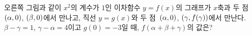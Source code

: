 \noindent\begin{minipage}[t]{0.58\linewidth}\vspace{0pt}\raggedright 오른쪽 그림과 같이 $x^2$의 계수가 $1$인 이차함수 $y=f(x)$의 그래프가 $x$축과 두 점~$(\alpha{,}\mkern3mu\mathopen{}0)$, $(\beta{,}\mkern3mu\mathopen{}0)$에서 만나고, 직선 $y=g(x)$와 두 점~$(\alpha{,}\mkern3mu\mathopen{}0)$, $(\gamma{,}\mkern3mu\mathopen{}f(\gamma))$에서 만난다. $\beta-\gamma=1$, $\gamma-\alpha=4$이고 $g(0)=-3$일 때, $f(\alpha+\beta+\gamma)$의 값은? \dmcondfill{$\alpha<\gamma<\beta$}{}\end{minipage}\hfill\begin{minipage}[t]{0.4\linewidth}\vspace{0pt}\centering \resizebox{\ifdim\width>\linewidth\linewidth\else\width\fi}{!}{}\end{minipage}\par
{}
